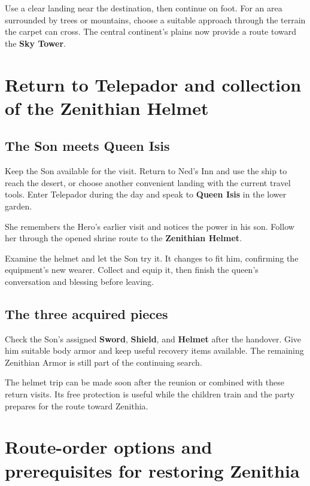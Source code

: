 Use a clear landing near the destination, then continue on foot.
For an area surrounded by trees or mountains, choose a suitable
approach through the terrain the carpet can cross. The central
continent's plains now provide a route toward the \textbf{Sky Tower}.

\section{Return to Telepador and collection of the Zenithian Helmet}

\subsection*{The Son meets Queen Isis}

Keep the Son available for the visit. Return to Ned's Inn and use
the ship to reach the desert, or choose another convenient landing
with the current travel tools. Enter Telepador during the day and
speak to \textbf{Queen Isis} in the lower garden.

She remembers the Hero's earlier visit and notices the power in
his son. Follow her through the opened shrine route to the
\textbf{Zenithian Helmet}.

Examine the helmet and let the Son try it. It changes to fit him,
confirming the equipment's new wearer. Collect and equip it, then
finish the queen's conversation and blessing before leaving.


\subsection*{The three acquired pieces}

Check the Son's assigned \textbf{Sword}, \textbf{Shield}, and
\textbf{Helmet} after the handover. Give him suitable body armor
and keep useful recovery items available. The remaining Zenithian
Armor is still part of the continuing search.

The helmet trip can be made soon after the reunion or combined
with these return visits. Its free protection is useful while the
children train and the party prepares for the route toward Zenithia.

\section{Route-order options and prerequisites for restoring Zenithia}


